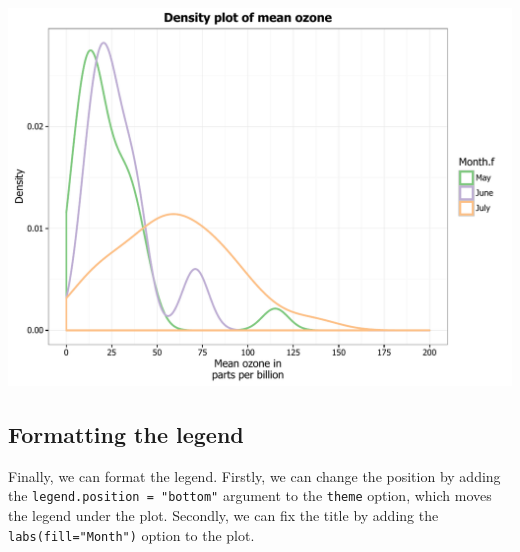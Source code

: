 \documentclass[]{article}
\begin{document}
\begin{center}\includegraphics{0_all_posts_pdf/density_18-1} \end{center}

\subsection{Formatting the legend}\label{formatting-the-legend-1}

Finally, we can format the legend. Firstly, we can change the position
by adding the \texttt{legend.position\ =\ "bottom"} argument to the
\texttt{theme} option, which moves the legend under the plot. Secondly,
we can fix the title by adding the \texttt{labs(fill="Month")} option to
the plot.
\end{document}
